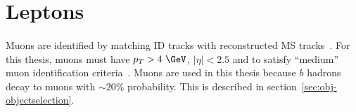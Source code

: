 \section{Leptons}



\paragraph{}
Muons are identified by matching ID tracks with reconstructed MS tracks~\cite{Aad:2016jkr}. 
For this thesis, muons must have $p_T > 4~\GeV$, $|\eta| < 2.5$ and to satisfy ``medium'' muon identification criteria~\cite{Aad:2016jkr}. 
Muons are used in this thesis because $b$ hadrons decay to muons with $\sim 20\%$ probability. This is described in section~\ref{sec:obj-objectselection}.


